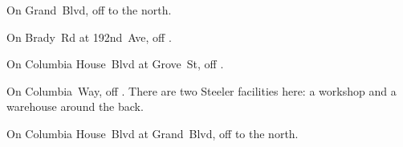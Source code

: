 
\begin{LocationList}

On Grand~Blvd, off   to the north.

On Brady~Rd at 192nd~Ave, off  .

\Location{\GasStation \Gas}
On Columbia House~Blvd at Grove~St, off  .

On Columbia~Way, off  .
There are two Steeler facilities here: a workshop and a warehouse around the back.

On Columbia House~Blvd at Grand~Blvd, off   to the north.

\end{LocationList}




